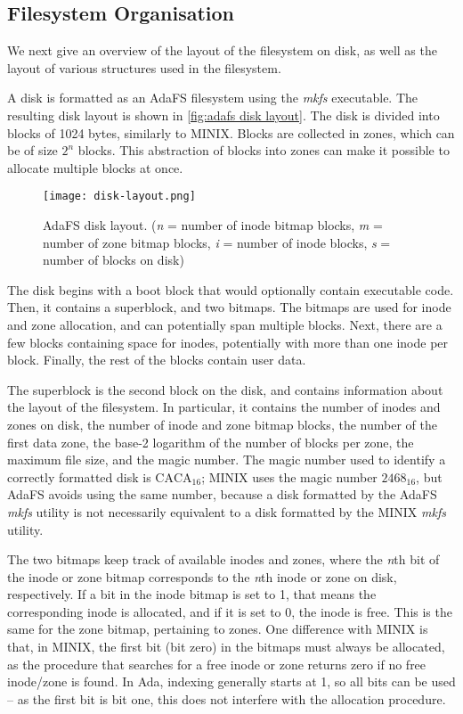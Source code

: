 \subsection{Filesystem Organisation}
We next give an overview of the layout of the filesystem on disk, as well as the layout of various structures used in the filesystem.

A disk is formatted as an AdaFS filesystem using the \textit{mkfs} executable.
The resulting disk layout is shown in \autoref{fig:adafs disk layout}.
The disk is divided into blocks of 1024 bytes, similarly to MINIX.
Blocks are collected in zones, which can be of size $2^n$ blocks.
This abstraction of blocks into zones can make it possible to allocate multiple blocks at once.

\begin{figure}[tb]
  \centering
  \texttt{[image: disk-layout.png]}
  \caption{AdaFS disk layout. (\textit{n} = number of inode bitmap blocks, \textit{m} = number of zone bitmap blocks, \textit{i} = number of inode blocks, \textit{s} = number of blocks on disk)}
  \label{fig:adafs disk layout}
\end{figure}

The disk begins with a boot block that would optionally contain executable code.
Then, it contains a superblock, and two bitmaps.
The bitmaps are used for inode and zone allocation, and can potentially span multiple blocks.
Next, there are a few blocks containing space for inodes, potentially with more than one inode per block.
Finally, the rest of the blocks contain user data.

The superblock is the second block on the disk, and contains information about the layout of the filesystem.
In particular, it contains the number of inodes and zones on disk, the number of inode and zone bitmap blocks, the number of the first data zone, the base-2 logarithm of the number of blocks per zone, the maximum file size, and the magic number.
The magic number used to identify a correctly formatted disk is $\text{CACA}_{16}$; MINIX uses the magic number $2468_{16}$, but AdaFS avoids using the same number, because a disk formatted by the AdaFS \textit{mkfs} utility is not necessarily equivalent to a disk formatted by the MINIX \textit{mkfs} utility.

The two bitmaps keep track of available inodes and zones, where the \textit{n}th bit of the inode or zone bitmap corresponds to the \textit{n}th inode or zone on disk, respectively.
If a bit in the inode bitmap is set to 1, that means the corresponding inode is allocated, and if it is set to 0, the inode is free.
This is the same for the zone bitmap, pertaining to zones.
One difference with MINIX is that, in MINIX, the first bit (bit zero) in the bitmaps must always be allocated, as the procedure that searches for a free inode or zone returns zero if no free inode/zone is found.
In Ada, indexing generally starts at 1, so all bits can be used -- as the first bit is bit one, this does not interfere with the allocation procedure.

